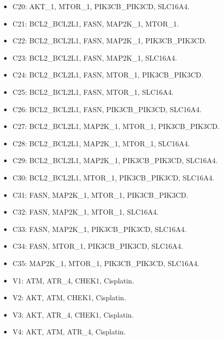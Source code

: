 \begin{itemize}
\item C20: AKT\_1, MTOR\_1, PIK3CB\_PIK3CD, SLC16A4.

\item C21: BCL2\_BCL2L1, FASN, MAP2K\_1, MTOR\_1.

\item C22: BCL2\_BCL2L1, FASN, MAP2K\_1, PIK3CB\_PIK3CD.

\item C23: BCL2\_BCL2L1, FASN, MAP2K\_1, SLC16A4.

\item C24: BCL2\_BCL2L1, FASN, MTOR\_1, PIK3CB\_PIK3CD.

\item C25: BCL2\_BCL2L1, FASN, MTOR\_1, SLC16A4.

\item C26: BCL2\_BCL2L1, FASN, PIK3CB\_PIK3CD, SLC16A4.

\item C27: BCL2\_BCL2L1, MAP2K\_1, MTOR\_1, PIK3CB\_PIK3CD.

\item C28: BCL2\_BCL2L1, MAP2K\_1, MTOR\_1, SLC16A4.

\item C29: BCL2\_BCL2L1, MAP2K\_1, PIK3CB\_PIK3CD, SLC16A4.

\item C30: BCL2\_BCL2L1, MTOR\_1, PIK3CB\_PIK3CD, SLC16A4.

\item C31: FASN, MAP2K\_1, MTOR\_1, PIK3CB\_PIK3CD.

\item C32: FASN, MAP2K\_1, MTOR\_1, SLC16A4.

\item C33: FASN, MAP2K\_1, PIK3CB\_PIK3CD, SLC16A4.

\item C34: FASN, MTOR\_1, PIK3CB\_PIK3CD, SLC16A4.

\item C35: MAP2K\_1, MTOR\_1, PIK3CB\_PIK3CD, SLC16A4.

\item V1: ATM, ATR\_4, CHEK1, Cisplatin.

\item V2: AKT, ATM, CHEK1, Cisplatin.

\item V3: AKT, ATR\_4, CHEK1, Cisplatin.

\item V4: AKT, ATM, ATR\_4, Cisplatin.

\end{itemize}

